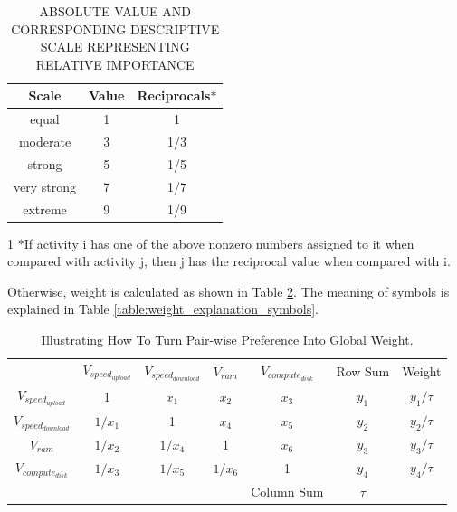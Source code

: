 \begin{table}[!ht]
\begin{center}\caption{ABSOLUTE VALUE AND CORRESPONDING DESCRIPTIVE SCALE REPRESENTING RELATIVE IMPORTANCE} \label{table:scale}
\begin{tabular}{|c|c|c|}
\hline
\textbf{Scale }&  \textbf{Value } & Reciprocals\tnote{1}$*$ \\
\hline equal & 1 & 1\\
\hline moderate & 3 & 1/3 \\
\hline strong & 5 & 1/5 \\
\hline very strong & 7 & 1/7 \\
\hline extreme & 9 & 1/9\\
\hline
\end{tabular}
\begin{tablenotes}
  \item[1] $*$If activity i has one of the above nonzero numbers assigned to it when compared with activity j, then j has the reciprocal value when compared with i.
\end{tablenotes}
\end{center}
\end{table}

Otherwise, weight is calculated as shown in Table \ref{table:weight}. 
The meaning of symbols is explained in Table \ref{table:weight_explanation_symbols}.

\begin{table}[!ht]
\begin{center}
\caption{Illustrating How To Turn Pair-wise Preference Into Global Weight.}
\label{table:weight}
\begin{tabular}{ccccccc}
& $V_{speed_{upload}}$ & $V_{speed_{download}}$ & $V_{ram}$ & $V_{compute_{disk}}$ & Row Sum & Weight \\
$V_{speed_{upload}}$ & 1 & ${x_{1}}$ & ${x_{2}}$ & ${x_{3}}$ & ${y_{1}}$ & ${y_1}/\tau$  \\
$V_{speed_{download}}$ & $1/{x_1}$ & 1  & ${x_{4}}$ & ${x_{5}}$ & ${y_{2}}$ & ${y_2}/\tau$  \\
$V_{ram}$ & $1/{x_2}$ & $1/{x_4}$ & 1 & ${x_{6}}$ & ${y_{3}}$ & ${y_3}/\tau$ \\
$V_{compute_{disk}}$ & $1/{x_3}$ & $1/{x_5}$ & $1/{x_{6}}$ & 1 & ${y_{4}}$ & ${y_4}/\tau$ \\
& & & & Column Sum & $\tau$ & \\
\end{tabular}
\end{center}
\end{table}

